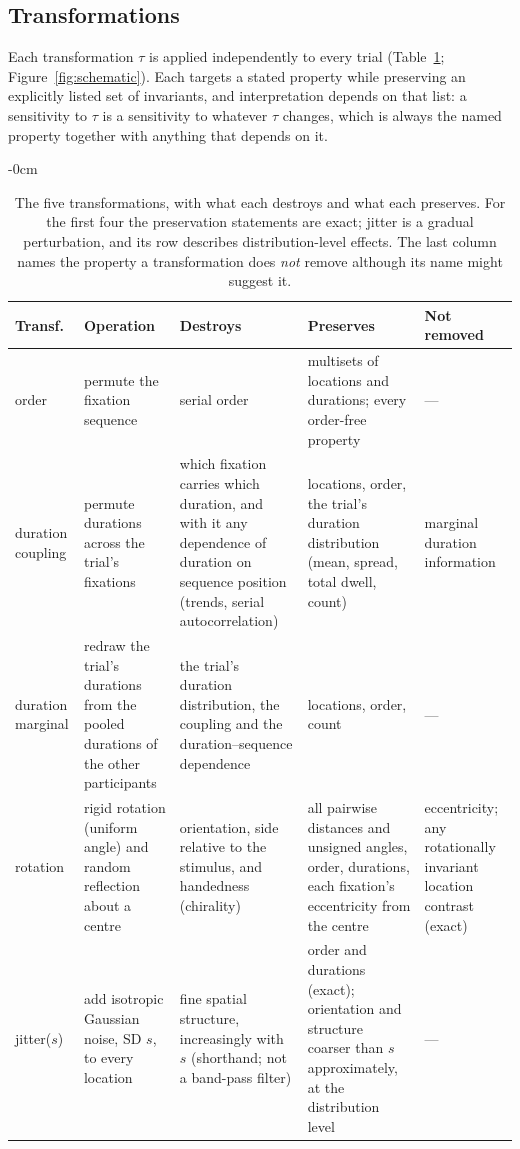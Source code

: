\subsection{Transformations}\label{sec:transf}
Each transformation $\tau$ is applied independently to every trial (Table~\ref{tab:nulls}; Figure~\ref{fig:schematic}). Each targets a stated property while preserving an explicitly listed set of invariants, and interpretation depends on that list: a sensitivity to $\tau$ is a sensitivity to whatever $\tau$ changes, which is always the named property together with anything that depends on it.

\begin{table}[!htbp]
\centering\small
\caption{The five transformations, with what each destroys and what each preserves. For the first four the preservation statements are exact; jitter is a gradual perturbation, and its row describes distribution-level effects. The last column names the property a transformation does \emph{not} remove although its name might suggest it.}
\label{tab:nulls}
\begin{adjustwidth}{-\extralength}{0cm}
\centering
\begin{tabular}{p{2.1cm}p{3.4cm}p{2.5cm}p{3.5cm}p{2.5cm}}
\toprule
Transf. & Operation & Destroys & Preserves & Not removed \\
\midrule
order & permute the fixation sequence & serial order & multisets of locations and durations; every order-free property & --- \\
duration coupling & permute durations across the trial's fixations & which fixation carries which duration, and with it any dependence of duration on sequence position (trends, serial autocorrelation) & locations, order, the trial's duration distribution (mean, spread, total dwell, count) & marginal duration information \\
duration marginal & redraw the trial's durations from the pooled durations of the other participants & the trial's duration distribution, the coupling and the duration--sequence dependence & locations, order, count & --- \\
rotation & rigid rotation (uniform angle) and random reflection about a centre & orientation, side relative to the stimulus, and handedness (chirality) & all pairwise distances and unsigned angles, order, durations, each fixation's eccentricity from the centre & eccentricity; any rotationally invariant location contrast (exact) \\
jitter($s$) & add isotropic Gaussian noise, SD $s$, to every location & fine spatial structure, increasingly with $s$ (shorthand; not a band-pass filter) & order and durations (exact); orientation and structure coarser than $s$ approximately, at the distribution level & --- \\
\bottomrule
\end{tabular}
\end{adjustwidth}
\end{table}

